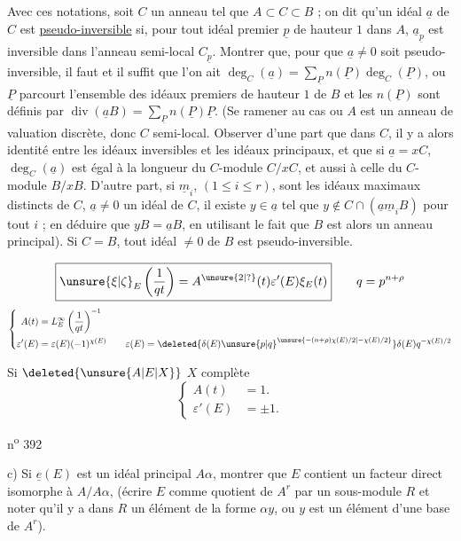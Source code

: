 Avec ces notations, soit $C$ un anneau tel que $A\subset C\subset B$ ; on dit qu'un idéal $\underline a$ de $C$ est \uline{pseudo-inversible} si, pour tout idéal premier $\underline p$ de hauteur $1$ dans $A$, $\underline a_{\underline p}$ est inversible dans l'anneau semi-local $C_{\underline p}$. Montrer que, pour que $\underline a\ne 0$ soit pseudo-inversible, il faut et il suffit que l'on ait $\deg_C(\underline a)=\sum_{\underline P}n(\underline P)\deg_C(\underline P)$, o\rlap{\handwritten{\`{\phantom{u}}}}u $\underline P$ parcourt l'ensemble des idéaux premiers de hauteur $1$ de $B$ et les $n(\underline P)$ sont définis par $\operatorname{div}(\underline a B)=\sum_{\underline P}n(\underline P)\underline P$. (Se ramener au cas o\rlap{\handwritten{\`{\phantom{u}}}}u $A$ est un anneau de valuation discrète, donc $C$ semi-local. Observer d'une part que dans $C$, il y a alors identité entre les idéaux inversibles et les idéaux principaux, et que si $\underline a=xC$, $\deg_C(\underline a)$ est égal à la longueur du $C$-module $C/xC$, et aussi à celle du $C$-module $B/xB$. D'autre part, si $\underline m_i$, $(1\leq i\leq r)$, sont les idéaux maximaux distincts de $C$, $\underline a\ne 0$ un idéal de $C$, il existe $y\in\underline a$ tel que $y\notin C\cap(\underline a\underline m_i B)$ pour tout $i$ ; en déduire que $yB=\underline a B$, en utilisant le fait que $B$ est alors un anneau principal). Si $C=B$, tout idéal $\ne 0$ de $B$ est pseudo-inversible.

\[
 \boxed{\unsure{\xi|\zeta}_E\left(\frac{1}{qt}\right)
 =A^{\unsure{2|?}}(t)\varepsilon'(E)\xi_E(t)}
 \qquad q=p^{n+\rho}
\]
\[
 \left\{\begin{aligned}
 A(t)&=L_E^\infty\left(\frac{1}{qt}\right)^{-1}\\
 \varepsilon'(E)&=\varepsilon(E)(-1)^{\chi(E)}
 \qquad \varepsilon(E)=
 \deleted{\delta(E)\unsure{p|q}^{\unsure{-(n+\rho)\chi(E)/2|-\chi(E)/2}}}
 \delta(E)q^{-\chi(E)/2}
 \end{aligned}\right.
\]

Si $\deleted{\unsure{A|E|X}}$ $X$ complète
\[
 \left\{\begin{aligned}
 A(t)&=1.\\
 \varepsilon'(E)&=\pm1.
 \end{aligned}\right.
\]

\unsure{,}\hfill n\textsuperscript{o} 392

c) Si $\underline e(E)$ est un idéal principal $A\alpha$, montrer que $E$ contient un facteur direct isomorphe à $A/A\alpha$, (écrire $E$ comme quotient de $A^r$ par un sous-module $R$ et noter qu'il y a dans $R$ un élément de la forme $\alpha y$, o\rlap{\handwritten{\`{\phantom{u}}}}u $y$ est un élément d'une base de $A^r$).

